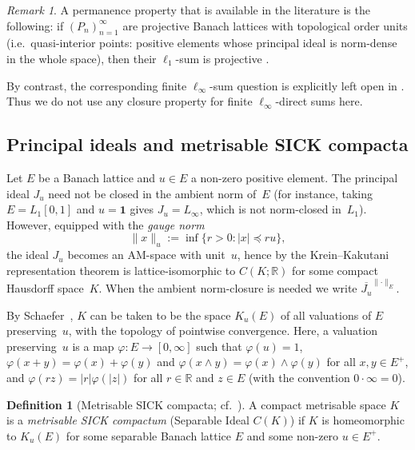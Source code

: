 \documentclass[12pt]{amsart}
\theoremstyle{plain}
\theoremstyle{definition}
\newtheorem{definition}[theorem]{Definition}
\theoremstyle{remark}
\newtheorem{remark}[theorem]{Remark}
\newcommand{\R}{\mathbb{R}}
\begin{document}
\begin{remark}\label{rem:proj-structure}
A permanence property that is available in the literature is the following:
if $(P_n)_{n=1}^\infty$ are projective Banach lattices with topological order
units (i.e.\ quasi-interior points: positive elements whose principal ideal is
norm-dense in the whole space), then their $\ell_1$-sum is projective
\cite[Theorem~11.8]{de2015free}.

By contrast, the corresponding finite $\ell_\infty$-sum question is explicitly
left open in \cite[Question~12.12]{de2015free}.  Thus we do not use any
closure property for finite $\ell_\infty$-direct sums here.
\end{remark}

\subsection{Principal ideals and metrisable SICK compacta}\label{subsec:principal-ideals}

Let $E$ be a Banach lattice and $u \in E$ a non-zero positive element.  The
principal ideal $J_u$ need not be closed in the ambient norm of~$E$ (for
instance, taking $E = L_1[0,1]$ and $u = \mathbf{1}$ gives $J_u = L_\infty$,
which is not norm-closed in~$L_1$).  However, equipped with the \emph{gauge norm}
\[
    \lVert x \rVert_u := \inf\{r > 0 \colon \lvert x \rvert \preceq r u\},
\]
the ideal $J_u$ becomes an AM-space with unit~$u$, hence by the
Krein--Kakutani representation theorem is lattice-isomorphic to $C(K; \R)$ for
some compact Hausdorff space~$K$.  When the ambient norm-closure is needed we
write $\overline{J_u}^{\lVert\cdot\rVert_E}$.

By Schaefer~\cite{Scha1974Ban}, $K$ can be taken to be the space $K_u(E)$ of
all valuations of $E$ preserving~$u$, with the topology of pointwise convergence.
Here, a valuation preserving~$u$ is a map $\varphi \colon E \to [0, \infty]$ such
that $\varphi(u) = 1$, $\varphi(x + y) = \varphi(x) + \varphi(y)$ and
$\varphi(x \wedge y) = \varphi(x) \wedge \varphi(y)$ for all $x, y \in E^+$,
and $\varphi(r z) = \lvert r \rvert \varphi(\lvert z \rvert)$ for all
$r \in \R$ and $z \in E$ (with the convention $0 \cdot \infty = 0$).

\begin{definition}[Metrisable SICK compacta; cf.~{\cite{AMRT2022Sick}}]
A compact metrisable space $K$ is a \emph{metrisable SICK compactum} (Separable
Ideal $C(K)$) if $K$ is homeomorphic to $K_u(E)$ for some separable Banach
lattice $E$ and some non-zero $u \in E^+$.
\end{definition}
\end{document}
